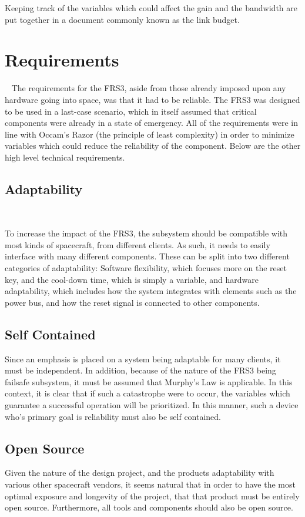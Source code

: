 \documentclass[12pt, twoside]{report}
\begin{document}
\par Keeping track of the variables which could affect the gain and the bandwidth are put together in a document commonly known as the link budget.

\chapter{Requirements}~\label{Requirements}
The requirements for the FRS3, aside from those already imposed upon any hardware going into space, was that it had to be reliable. The FRS3 was designed to be used in a last-case scenario, which in itself assumed that critical components were already in a state of emergency. All of the requirements were in line with Occam's Razor (the principle of least complexity) in order to minimize variables which could reduce the reliability of the component. Below are the other high level technical requirements.

\section{Adaptability}~\label{Adaptability}
\par To increase the impact of the FRS3, the subsystem should be compatible with most kinds of spacecraft, from different clients. As such, it needs to  easily interface with many different components. These can be split into two different categories of adaptability: Software flexibility, which focuses more on the reset key, and the cool-down time, which is simply a variable, and hardware adaptability, which includes how the system integrates with elements such as the power bus, and how the reset signal is connected to other components.

\section{Self Contained}
\par Since an emphasis is placed on a system being adaptable for many clients, it must be independent. In addition, because of the nature of the FRS3 being failsafe subsystem, it must be assumed that Murphy's Law is applicable. In this context, it is clear that if such a catastrophe were to occur, the variables which guarantee a successful operation will be prioritized. In this manner, such a device who's primary goal is reliability must also be self contained.

\section{Open Source}
\par Given the nature of the design project, and the products adaptability with various other spacecraft vendors, it seems natural that in order to have the most optimal exposure and longevity of the project, that that product must be entirely open source. Furthermore, all tools and components should also be open source.
\end{document}
